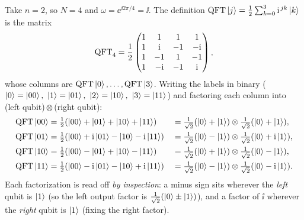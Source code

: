 \begin{example}[The $n=2$ QFT, worked in full]
\label{ex-l4:n2}
Take $n=2$, so $N=4$ and $\omega=\ee^{\ii 2\pi/4}=\ii$. The definition
$\mathrm{QFT}\ket{j}=\tfrac12\sum_{k=0}^{3}\mathrm{i}^{\,jk}\ket{k}$ is the matrix
\[
  \mathrm{QFT}_4=\frac12\begin{pmatrix}
    1 & 1 & 1 & 1\\
    1 & \mathrm{i} & -1 & -\mathrm{i}\\
    1 & -1 & 1 & -1\\
    1 & -\mathrm{i} & -1 & \mathrm{i}
  \end{pmatrix},
\]
whose columns are $\mathrm{QFT}\ket{0},\dots,\mathrm{QFT}\ket{3}$. Writing the labels in binary
($\ket0=\ket{00},\ \ket1=\ket{01},\ \ket2=\ket{10},\ \ket3=\ket{11}$) and factoring each
column into (left qubit)\,$\otimes$\,(right qubit):
\[
\begin{aligned}
  \mathrm{QFT}\ket{00}&=\tfrac12(\ket{00}+\ket{01}+\ket{10}+\ket{11})
    &&=\tfrac1{\sqrt2}(\ket0+\ket1)\otimes\tfrac1{\sqrt2}(\ket0+\ket1),\\
  \mathrm{QFT}\ket{01}&=\tfrac12(\ket{00}+\mathrm{i}\ket{01}-\ket{10}-\mathrm{i}\ket{11})
    &&=\tfrac1{\sqrt2}(\ket0-\ket1)\otimes\tfrac1{\sqrt2}(\ket0+\mathrm{i}\ket1),\\
  \mathrm{QFT}\ket{10}&=\tfrac12(\ket{00}-\ket{01}+\ket{10}-\ket{11})
    &&=\tfrac1{\sqrt2}(\ket0+\ket1)\otimes\tfrac1{\sqrt2}(\ket0-\ket1),\\
  \mathrm{QFT}\ket{11}&=\tfrac12(\ket{00}-\mathrm{i}\ket{01}-\ket{10}+\mathrm{i}\ket{11})
    &&=\tfrac1{\sqrt2}(\ket0-\ket1)\otimes\tfrac1{\sqrt2}(\ket0-\mathrm{i}\ket1).
\end{aligned}
\]
Each factorization is read off \emph{by inspection}: a minus sign sits wherever the
\emph{left} qubit is $\ket1$ (so the left output factor is $\tfrac1{\sqrt2}(\ket0\pm\ket1)$),
and a factor of $\ii$ wherever the \emph{right} qubit is $\ket1$ (fixing the right factor).


\end{example}
